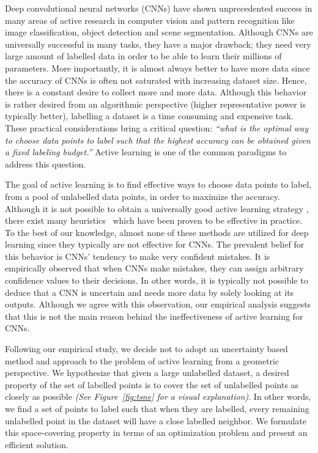\documentclass{article}
\begin{document}
Deep convolutional neural networks (CNNs) have shown unprecedented success in many areas of active research in computer vision and pattern recognition like image classification, object detection and scene segmentation. Although CNNs are universally successful in many tasks, they have a major drawback; they need very large amount of labelled data in order to be able to learn their millions of parameters. More importantly, it is almost always better to have more data since the accuracy of CNNs is often not saturated with increasing dataset size. Hence, there is a constant desire to collect more and more data. Although this behavior is rather desired from an algorithmic perspective (higher representative power is typically better), labelling a dataset is a time consuming and expensive task. These practical considerations bring a critical question: \emph{``what is the optimal way to choose data points to label such that the highest accuracy can be obtained given a fixed labeling budget.''} Active learning is one of the common paradigms to address this question.

The goal of active learning is to find effective ways to choose data points to label, from a pool of unlabelled data points, in order to maximize the accuracy. Although it is not possible to obtain a universally good active learning strategy \cite{dasgupta2004analysis}, there exist many heuristics~\cite{settles2010active} which have been proven to be effective in practice. To the best of our knowledge, almost none of these methods are utilized for deep learning since they typically are not effective for CNNs. The prevalent belief for this behavior is CNNs' tendency to make very confident mistakes. It is empirically observed that when CNNs make mistakes, they can assign arbitrary confidence values to their decisions. In other words, it is typically not possible to deduce that a CNN is uncertain and needs more data by solely looking at its outputs. Although we agree with this observation, our empirical analysis suggests that this is not the main reason behind the ineffectiveness of active learning for CNNs. 

Following our empirical study, we decide not to adopt an uncertainty based method and approach to the problem of active learning from a geometric perspective. We hypothesize that given a large unlabelled dataset, a desired property of the set of labelled points is to cover the set of unlabelled points as closely as possible \emph{(See Figure~\ref{fig:tsne} for a visual explanation)}. In other words, we find a set of points to label such that when they are labelled, every remaining unlabelled point in the dataset will have a close labelled neighbor. We formulate this space-covering property in terms of an optimization problem and present an efficient solution.
\end{document}
